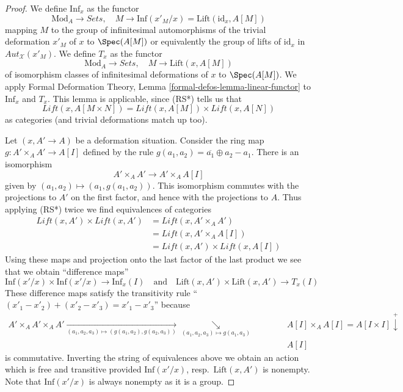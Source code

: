 \begin{proof}
We define $\text{Inf}_x$ as the functor
$$
\text{Mod}_A \longrightarrow \textit{Sets},\quad
M \longrightarrow
\text{Inf}(x'_M/x) = \text{Lift}(\text{id}_x, A[M])
$$
mapping $M$ to the group of infinitesimal automorphisms
of the trivial deformation $x'_M$ of $x$ to $\Spec(A[M])$
or equivalently the group of lifts of $\text{id}_x$ in
$\mathit{Aut}_\mathcal{X}(x'_M)$.
We define $T_x$ as the functor
$$
\text{Mod}_A \longrightarrow \textit{Sets},\quad
M \longrightarrow \text{Lift}(x, A[M])
$$
of isomorphism classes of infinitesimal deformations of $x$ to
$\Spec(A[M])$. We apply Formal Deformation Theory, Lemma
\ref{formal-defos-lemma-linear-functor}
to $\text{Inf}_x$ and $T_x$. This lemma is applicable, since
(RS*) tells us that
$$
\textit{Lift}(x, A[M \times N]) =
\textit{Lift}(x, A[M]) \times \textit{Lift}(x, A[N])
$$
as categories (and trivial deformations match up too).

\medskip\noindent
Let $(x, A' \to A)$ be a deformation situation. Consider the ring map
$g : A' \times_A A' \to A[I]$ defined by the
rule $g(a_1, a_2) = \overline{a_1} \oplus a_2 - a_1$.
There is an isomorphism
$$
A' \times_A A' \longrightarrow A' \times_A A[I]
$$
given by $(a_1, a_2) \mapsto (a_1, g(a_1, a_2))$.
This isomorphism commutes with the projections to $A'$ on the first
factor, and hence with the projections to $A$. Thus applying (RS*)
twice we find equivalences of categories
\begin{align*}
\textit{Lift}(x, A') \times \textit{Lift}(x, A')
& =
\textit{Lift}(x, A' \times_A A') \\
& =
\textit{Lift}(x, A' \times_A A[I]) \\
& =
\textit{Lift}(x, A') \times \textit{Lift}(x, A[I])
\end{align*}
Using these maps and projection onto the last factor of the last product
we see that we obtain ``difference maps''
$$
\text{Inf}(x'/x) \times  \text{Inf}(x'/x)
\longrightarrow
\text{Inf}_x(I)
\quad\text{and}\quad
\text{Lift}(x, A') \times \text{Lift}(x, A')
\longrightarrow
T_x(I)
$$
These difference maps satisfy the transitivity rule
``$(x'_1 - x'_2) + (x'_2 - x'_3) = x'_1 - x'_3$'' because
$$
\begin{array}{cccccc}A' \times_A A' \times_A A'
\underset{(a_1, a_2, a_3) \mapsto (g(a_1, a_2), g(a_2, a_3))}{\longrightarrow}\underset{(a_1, a_2, a_3) \mapsto g(a_1, a_3)}{\searrow} &  &  &  &  & A[I] \times_A A[I] = A[I \times I] \overset{+}{\downarrow} \\  &  &  &  &  & A[I]\end{array}
$$
is commutative. Inverting the string of equivalences above we obtain
an action which is free and transitive provided $\text{Inf}(x'/x)$,
resp.\ $\text{Lift}(x, A')$ is nonempty. Note that $\text{Inf}(x'/x)$
is always nonempty as it is a group.
\end{proof}

